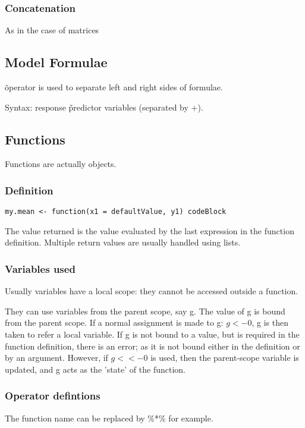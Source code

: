 \subsubsection{Concatenation}
As in the case of matrices

\subsection{Model Formulae}
\~ operator is used to separate left and right sides of formulae.

Syntax: response \~ predictor variables (separated by +).

\subsection{Functions}
Functions are actually objects.

\subsubsection{Definition}
\begin{verbatim}
my.mean <- function(x1 = defaultValue, y1) codeBlock
\end{verbatim}

The value returned is the value evaluated by the last expression in the function definition. Multiple return values are usually handled using lists.

\subsubsection{Variables used}
Usually variables have a local scope: they cannot be accessed outside a function.

They can use variables from the parent scope, say g. The value of g is bound from the parent scope. If a normal assignment is made to g: $g <- 0$, g is then taken to refer a local variable. If g is not bound to a value, but is required in the function definition, there is an error; as it is not bound either in the definition or by an argument. However, if $g <<- 0$ is used, then the parent-scope variable is updated, and g acts as the 'state' of the function.

\subsubsection{Operator defintions}
The function name can be replaced by \%*\% for example.

